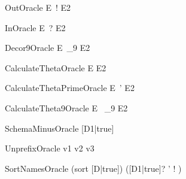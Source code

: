 \documentclass{article}
\newcommand{\unprefix}{\mathrel{unprefix}}
\begin{document}
\begin{zedoracle}{OutOracle}
  E~! \is E2
\end{zedoracle}

\begin{zedoracle}{InOracle}
  E~? \is E2
\end{zedoracle}

\begin{zedoracle}{Decor9Oracle}
  E~_9 \is E2
\end{zedoracle}

\begin{zedoracle}{CalculateThetaOracle}
  \theta E \is E2
\end{zedoracle}

\begin{zedoracle}{CalculateThetaPrimeOracle}
  \theta E~' \is E2
\end{zedoracle}

\begin{zedoracle}{CalculateTheta9Oracle}
  \theta E~ _9 \is E2
\end{zedoracle}

\begin{zedoracle}{SchemaMinusOracle}
  [D1|true] \schemaminus [D2|true] \is [D3|true]
\end{zedoracle}

\begin{zedoracle}{UnprefixOracle}
  v1 \unprefix v2 \is v3
\end{zedoracle}

\begin{zedoracle}{SortNamesOracle}
  (sort [D|true]) \is ([D1|true]? \land [D2|true]' \land
                       [D3|true]! \land [D4|true])
\end{zedoracle}
\end{document}
